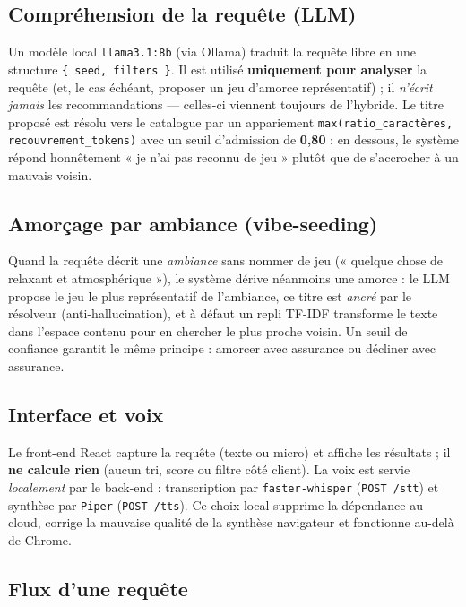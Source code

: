 \documentclass[11pt,a4paper]{article}
\begin{document}
\subsection{Compréhension de la requête (LLM)}

Un modèle local \texttt{llama3.1:8b} (via Ollama) traduit la requête libre en une
structure \texttt{\{ seed, filters \}}. Il est utilisé \textbf{uniquement pour
analyser} la requête (et, le cas échéant, proposer un jeu d'amorce
représentatif) ; il \emph{n'écrit jamais} les recommandations — celles-ci
viennent toujours de l'hybride. Le titre proposé est résolu vers le catalogue
par un appariement \texttt{max(ratio\_caractères, recouvrement\_tokens)} avec un
seuil d'admission de \textbf{0{,}80} : en dessous, le système répond honnêtement
« je n'ai pas reconnu de jeu » plutôt que de s'accrocher à un mauvais voisin.

\subsection{Amorçage par ambiance (vibe-seeding)}

Quand la requête décrit une \emph{ambiance} sans nommer de jeu (« quelque chose
de relaxant et atmosphérique »), le système dérive néanmoins une amorce : le LLM
propose le jeu le plus représentatif de l'ambiance, ce titre est \emph{ancré}
par le résolveur (anti-hallucination), et à défaut un repli TF-IDF transforme le
texte dans l'espace contenu pour en chercher le plus proche voisin. Un seuil de
confiance garantit le même principe : amorcer avec assurance ou décliner avec
assurance.

\subsection{Interface et voix}

Le front-end React capture la requête (texte ou micro) et affiche les résultats ;
il \textbf{ne calcule rien} (aucun tri, score ou filtre côté client). La voix est
servie \emph{localement} par le back-end : transcription par \texttt{faster-whisper}
(\texttt{POST /stt}) et synthèse par \texttt{Piper} (\texttt{POST /tts}). Ce choix
local supprime la dépendance au cloud, corrige la mauvaise qualité de la synthèse
navigateur et fonctionne au-delà de Chrome.

\subsection{Flux d'une requête}
\end{document}
